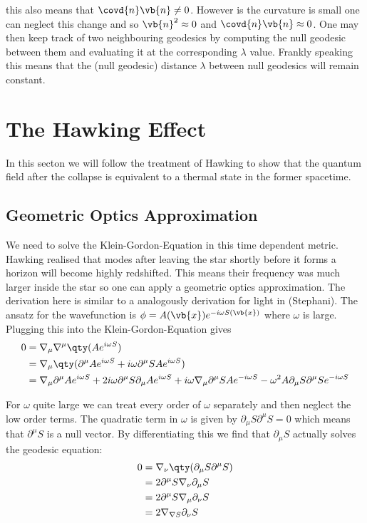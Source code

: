 this also means that \(\covd{n}\vb{n} \neq 0\). However is the curvature is small one can neglect this change and so \(\vb{n}^2 \approx 0\) and \(\covd{n}\vb{n} \approx 0\). One may then keep track of two neighbouring geodesics by computing the null geodesic between them and evaluating it at the corresponding \(\lambda\) value. Frankly speaking this means that the (null geodesic) distance \(\lambda\) between null geodesics will remain constant.

\section{The Hawking Effect}
\label{sec:app_hawking}
In this secton we will follow the treatment of Hawking  to show that the quantum field after the collapse is equivalent to a thermal state in the former spacetime.

\subsection{Geometric Optics Approximation}
We need to solve the Klein-Gordon-Equation in this time dependent metric. Hawking realised that modes after leaving the star shortly before it forms a horizon will become highly redshifted. This means their frequency was much larger inside the star so one can apply a geometric optics approximation. The derivation here is similar to a analogously derivation for light in (Stephani). The ansatz for the wavefunction is \(\phi = A(\vb{x}) e^{-i\omega S(\vb{x})}\) where \(\omega\) is large. Plugging this into the Klein-Gordon-Equation gives
\begin{align}
0 &= \nabla_\mu\nabla^\mu \qty(A e^{i\omega S})\\ 
 &= \nabla_\mu \qty(\partial^\mu A e^{i\omega S} + i \omega \partial^\mu S A e^{i\omega S})\\
&= \nabla_\mu \partial^\mu A e^{i\omega S} + 2 i \omega \partial^\mu S \partial_\mu A e^{i\omega S} + i \omega \nabla_\mu\partial^\mu S A e^{-i\omega S} - \omega^2 A \partial_\mu S \partial^\mu S e^{-i\omega S}
\end{align}

For \(\omega\) quite large we can treat every order of \(\omega\) separately and then neglect the low order terms. The quadratic term in \(\omega\) is given by \(\partial_\mu S \partial^\mu S = 0\) which means that \(\partial^\mu S\) is a null vector. By differentiating this we find that \(\partial_\mu S\) actually solves the geodesic equation: 
\begin{align}
0 &= \nabla_\nu \qty(\partial_\mu S \partial^\mu S)\\
	&= 2 \partial^\mu S \nabla_\nu \partial_\mu S\\
	&= 2 \partial^\mu S \nabla_\mu \partial_\nu S\\
	&= 2 \nabla_{\nabla S} \partial_\nu S 
\end{align}

